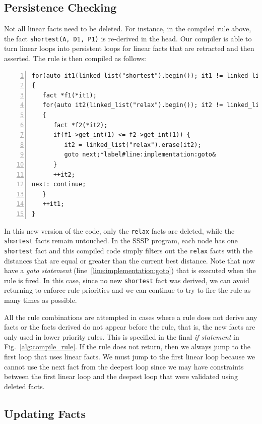 \subsection{Persistence Checking}

Not all linear facts need to be deleted. For instance, in the compiled rule
above, the fact \texttt{shortest(A, D1, P1)} is re-derived in the head. Our
compiler is able to turn linear loops into persistent loops for linear facts
that are retracted and then asserted.  The rule is then compiled as follows:

\begin{Verbatim}[numbers=left,fontsize=\codesize,commandchars=\*\#\&]
for(auto it1(linked_list("shortest").begin()); it1 != linked_list("shortest").end(); )
{
   fact *f1(*it1);
   for(auto it2(linked_list("relax").begin()); it2 != linked_list("relax").end(); )
   {
      fact *f2(*it2);
      if(f1->get_int(1) <= f2->get_int(1)) {
         it2 = linked_list("relax").erase(it2);
         goto next;*label#line:implementation:goto&
      }
      ++it2;
next: continue;
   }
   ++it1;
}
\end{Verbatim}

In this new version of the code, only the \texttt{relax} facts are deleted,
while the \texttt{shortest} facts remain untouched. In the SSSP program, each
node has one \texttt{shortest} fact and this compiled code simply filters out
the \texttt{relax} facts with the distances that are equal or greater than the
current best distance. Note that now have a \emph{goto statement}
(line~\ref{line:implementation:goto}) that is executed when the rule is fired.
In this case, since no new \texttt{shortest} fact was derived, we can avoid
returning to enforce rule priorities and we can continue to try to fire the rule
as many times as possible.

All the rule combinations are attempted in cases where a rule does not derive
any facts or the facts derived do not appear before the rule, that is, the new
facts are only used in lower priority rules. This is specified in the final
\emph{if statement} in Fig.~\ref{alg:compile_rule}. If the rule does not return,
then we always jump to the first loop that uses linear facts. We must jump to
the first linear loop because we cannot use
the next fact from the deepest loop since we may have constraints between the
first linear loop and the deepest loop that were validated using deleted facts.

\subsection{Updating Facts}

